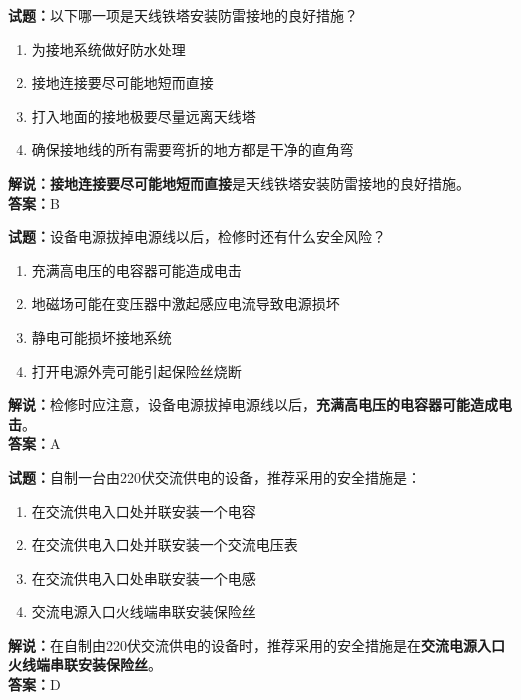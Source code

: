 \documentclass{ctexbook}
\begin{document}
\vspace{1em}

\textbf{试题：}以下哪一项是天线铁塔安装防雷接地的良好措施？
\begin{enumerate}[leftmargin=3em]
  \item 为接地系统做好防水处理
  \item 接地连接要尽可能地短而直接
  \item 打入地面的接地极要尽量远离天线塔
  \item 确保接地线的所有需要弯折的地方都是干净的直角弯
\end{enumerate}
\noindent\textbf{解说：}\textbf{接地连接要尽可能地短而直接}是天线铁塔安装防雷接地的良好措施。\\\noindent\textbf{答案：}B

\vspace{1em}

\textbf{试题：}设备电源拔掉电源线以后，检修时还有什么安全风险？
\begin{enumerate}[leftmargin=3em]
  \item 充满高电压的电容器可能造成电击
  \item 地磁场可能在变压器中激起感应电流导致电源损坏
  \item 静电可能损坏接地系统
  \item 打开电源外壳可能引起保险丝烧断
\end{enumerate}
\noindent\textbf{解说：}检修时应注意，设备电源拔掉电源线以后，\textbf{充满高电压的电容器可能造成电击}。\\\noindent\textbf{答案：}A

\vspace{1em}

\textbf{试题：}自制一台由220伏交流供电的设备，推荐采用的安全措施是：
\begin{enumerate}[leftmargin=3em]
  \item 在交流供电入口处并联安装一个电容
  \item 在交流供电入口处并联安装一个交流电压表
  \item 在交流供电入口处串联安装一个电感
  \item 交流电源入口火线端串联安装保险丝
\end{enumerate}
\noindent\textbf{解说：}在自制由220伏交流供电的设备时，推荐采用的安全措施是在\textbf{交流电源入口火线端串联安装保险丝}。\\\noindent\textbf{答案：}D


\end{document}
